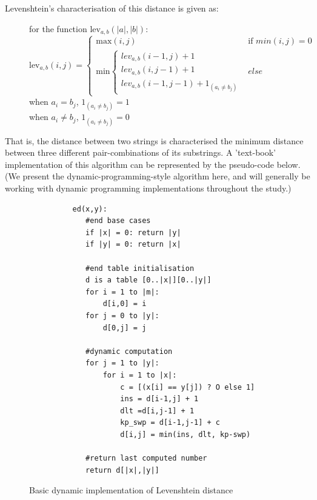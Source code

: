 \documentclass[a4paper,11pt,twoside,notitlepage]{article}
\begin{document}
        Levenshtein's characterisation of this distance is given as:


        
        \begin{figure}[h!]
          \centering
          for the function $\mbox{lev}_{a,b}(|a|,|b|)$:\\
          $$\mbox{lev}_{a,b}(i,j) = 
             \left\{
                \begin{array}{ll}
                  \mbox{max}(i,j) & \mbox{if }min(i,j) = 0\\
                  \mbox{min}\left\{
                        \begin{array}{lll}
                          lev_{a,b}(i-1,j)+1\\
                          lev_{a,b}(i,j-1)+1\\
                          lev_{a,b}(i-1,j-1)+1_{(a_i{\neq}b_j)}
                        \end{array}
                      \right.
	                & else 
	        \end{array}
             \right.$$
             when $a_i = b_j$, $1_{(a_i{\neq}b_j)} = 1$\\
             when  $a_i \neq b_j$, $1_{(a_i{\neq}b_j)} = 0$
        \end{figure}

        That is, the distance between two strings is characterised the
        minimum distance between three different pair-combinations of its
        substrings. A 'text-book' implementation of this algorithm can
        be represented by the pseudo-code below. (We present the
        dynamic-programming-style algorithm here, and will generally
        be working with dynamic programming implementations throughout
        the study.)
        
        \begin{figure}
          \centering
          \begin{lstlisting}
          ed(x,y):
             #end base cases
             if |x| = 0: return |y|
             if |y| = 0: return |x|    

             #end table initialisation
             d is a table [0..|x|][0..|y|]
             for i = 1 to |m|:
                 d[i,0] = i
             for j = 0 to |y|:
                 d[0,j] = j           
             
             #dynamic computation
             for j = 1 to |y|:
                 for i = 1 to |x|:
                     c = [(x[i] == y[j]) ? O else 1]
                     ins = d[i-1,j] + 1
                     dlt =d[i,j-1] + 1
                     kp_swp = d[i-1,j-1] + c
                     d[i,j] = min(ins, dlt, kp-swp)
             
             #return last computed number
             return d[|x|,|y|]
        \end{lstlisting}
        \caption{Basic dynamic implementation of Levenshtein distance}
        \label{fig:levenshtein-dynamic}
        \end{figure}
\end{document}
